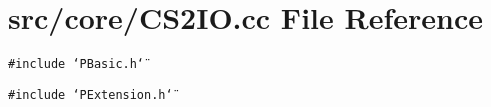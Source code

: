 \section{src/core/CS2IO.cc File Reference}
\label{CS2IO_8cc}


{\tt \#include \char`\"{}PBasic.h\char`\"{}}\par
{\tt \#include \char`\"{}PExtension.h\char`\"{}}\par
